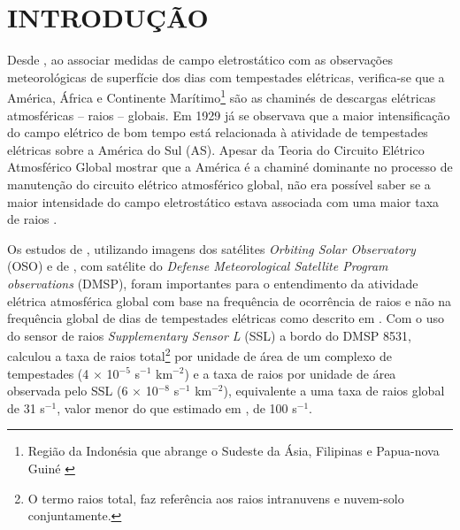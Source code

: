 \chapter{INTRODUÇÃO}

Desde , ao associar medidas de campo eletrostático com as observações meteorológicas de superfície dos dias com tempestades elétricas, verifica-se que a  América, África e Continente Marítimo\footnote{Região da Indonésia que abrange o Sudeste da Ásia, Filipinas e Papua-nova Guiné \cite{ramage1968,neale2003}} são as chaminés de descargas elétricas atmosféricas -- raios -- globais. Em 1929 já se observava que a maior intensificação do campo elétrico de bom tempo está relacionada à atividade de tempestades elétricas sobre a América do Sul (AS). Apesar da Teoria do Circuito Elétrico Atmosférico Global mostrar que a América é a chaminé dominante no processo de manutenção do circuito elétrico atmosférico global, não era possível saber se a maior intensidade do campo eletrostático estava associada com uma maior taxa de raios \cite{dolezalek1972}.




Os estudos de , utilizando imagens dos satélites \textit{Orbiting Solar Observatory} (OSO) e de  , com satélite do \textit{Defense Meteorological Satellite Program observations} (DMSP), foram importantes para o entendimento da atividade elétrica atmosférica global com base na frequência de ocorrência de raios e não na frequência global de dias de tempestades elétricas como descrito em . Com o uso do sensor de raios \textit{Supplementary Sensor L} (SSL) a bordo do DMSP 8531,  calculou a taxa de raios total\footnote{ O termo raios total, faz referência aos raios intranuvens e nuvem-solo conjuntamente.} por unidade de área de um complexo de tempestades (4 $\times$ 10$^{-5}$ s$^{-1}$ km$^{-2}$) e a taxa de raios por unidade de área observada pelo SSL (6 $\times$ 10$^{-8}$ s$^{-1}$ km$^{-2}$), equivalente a uma taxa de raios global de 31 s$^{-1}$, valor menor do que estimado em , de 100 s$^{-1}$.

